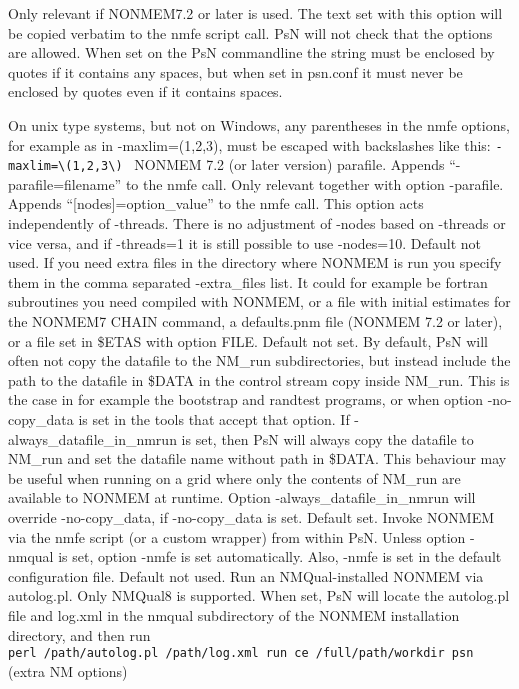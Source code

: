 \begin{optionlist}
Only relevant if NONMEM7.2 or later is used. 
The text set with this option will be copied verbatim to the nmfe script call. 
PsN will not check that the options are allowed. 
When set on the PsN commandline the string must be enclosed by quotes if it contains any spaces, 
but when set in psn.conf it must never be enclosed by quotes even if it contains spaces. 

On unix type systems, but not on Windows, any parentheses in the nmfe options, for example as in -maxlim=(1,2,3), must be
escaped with backslashes like this: \verb|-maxlim=\(1,2,3\) |
\nextopt
{}
NONMEM 7.2 (or later version) parafile. Appends “-parafile=filename” to the nmfe call. 
\nextopt
{}
Only relevant together with option -parafile. Appends “[nodes]=option\_value” to the nmfe call. This option acts independently of -threads. There is no adjustment of -nodes based on -threads or vice versa, and if -threads=1 it is still possible to use -nodes=10. 
\nextopt
{}
Default not used. If you need extra files in the directory where NONMEM is run you specify them in the comma separated -extra\_files list. It could for example be fortran subroutines you need compiled with NONMEM, or a file with initial estimates for the NONMEM7 CHAIN command, a defaults.pnm file (NONMEM 7.2 or later), or a file set in \$ETAS with option FILE. 
\nextopt
{}
Default not set.
By default, PsN will often not copy the datafile to the NM\_run 
subdirectories, but instead include the path to the datafile in \$DATA in
the control stream copy inside NM\_run. This is the case in for example
the bootstrap and randtest programs, or when option -no-copy\_data is set
in the tools that accept that option.
If -always\_datafile\_in\_nmrun is set, then PsN will always copy
the datafile to NM\_run and set the datafile name without path
in \$DATA. This behaviour may be useful when running on 
a grid where only the contents of NM\_run are available to NONMEM at 
runtime. Option -always\_datafile\_in\_nmrun will override -no-copy\_data, 
if -no-copy\_data is set.
\nextopt
{}
Default set.
Invoke NONMEM via the nmfe script (or a custom wrapper) from within PsN. 
Unless option -nmqual is set, option -nmfe is 
set automatically. Also, -nmfe is set in the default configuration file.
\nextopt
{}
Default not used. Run an NMQual-installed NONMEM via autolog.pl. Only NMQual8 is supported. 
When set, PsN will locate the autolog.pl file and log.xml in the nmqual subdirectory of the NONMEM installation directory, and then run \\
\verb|perl /path/autolog.pl /path/log.xml run ce /full/path/workdir psn| (extra NM options)


\end{optionlist}
